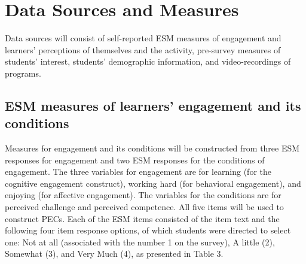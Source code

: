 \documentclass[]{book}
\theoremstyle{definition}
\theoremstyle{definition}
\theoremstyle{definition}
\theoremstyle{remark}
\begin{document}
\section{Data Sources and Measures}\label{data-sources-and-measures}

Data sources will consist of self-reported ESM measures of engagement
and learners' perceptions of themselves and the activity, pre-survey
measures of students' interest, students' demographic information, and
video-recordings of programs.

\subsection{ESM measures of learners' engagement and its
conditions}\label{esm-measures-of-learners-engagement-and-its-conditions}

Measures for engagement and its conditions will be constructed from
three ESM responses for engagement and two ESM responses for the
conditions of engagement. The three variables for engagement are for
learning (for the cognitive engagement construct), working hard (for
behavioral engagement), and enjoying (for affective engagement). The
variables for the conditions are for perceived challenge and perceived
competence. All five items will be used to construct PECs. Each of the
ESM items consisted of the item text and the following four item
response options, of which students were directed to select one: Not at
all (associated with the number 1 on the survey), A little (2), Somewhat
(3), and Very Much (4), as presented in Table 3.

\begin{table}

\caption{\label{tab:unnamed-chunk-4}ESM measures for profiles of engagement and its conditions (PECs)}
\centering
{}
\end{table}
\end{document}
